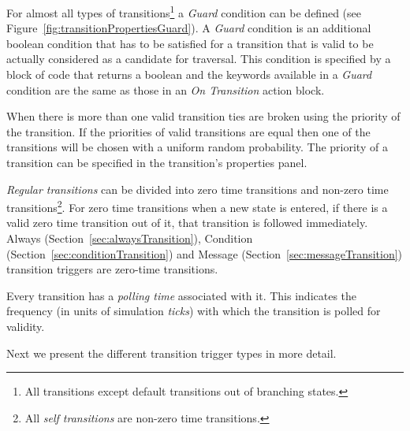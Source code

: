 \documentclass[11pt]{amsart}
\begin{document}
For almost all types of transitions\footnote{All transitions except default transitions out of branching states.} a \emph{Guard} condition can be defined (see Figure~\ref{fig:transitionPropertiesGuard}). A \emph{Guard} condition is an additional boolean condition that has to be satisfied for a transition that is valid to be actually considered as a candidate for traversal. This condition is specified by a block of code that returns a boolean and the keywords available in a \emph{Guard} condition are the same as those in an \emph{On Transition} action block.

When there is more than one valid transition ties are broken using the priority of the transition. If the priorities of valid transitions are equal then one of the transitions will be chosen with a uniform random probability. The priority of a transition can be specified in the transition's properties panel.

\emph{Regular transitions} can be divided into zero time transitions and non-zero time transitions\footnote{All \emph{self transitions} are non-zero time transitions.}. For zero time transitions when a new state is entered, if there is a valid zero time transition out of it, that transition is followed immediately. Always (Section~\ref{sec:alwaysTransition}), Condition (Section~\ref{sec:conditionTransition}) and Message (Section~\ref{sec:messageTransition}) transition triggers are zero-time transitions.

Every transition has a \emph{polling time} associated with it. This indicates the frequency (in units of simulation \emph{ticks}) with which the transition is polled for validity.

Next we present the different transition trigger types in more detail.
\end{document}

